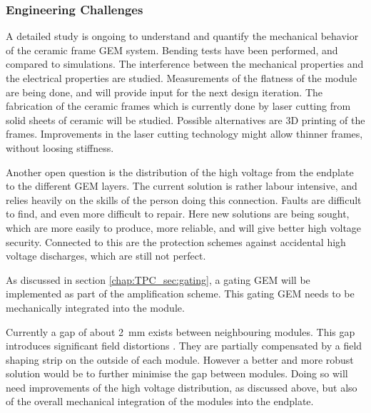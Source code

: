 \subsubsection{Engineering Challenges}
A detailed study is ongoing to understand and quantify the mechanical behavior of the ceramic frame GEM system. Bending tests have been performed, and compared to simulations. The interference between the mechanical properties and the electrical properties are studied. Measurements of the flatness of the module are being done, and will provide input for the next design iteration.
The fabrication of the ceramic frames which is currently done by laser cutting from solid sheets of ceramic will be studied. Possible alternatives are 3D printing of the frames. Improvements in the laser cutting technology might allow thinner frames, without loosing stiffness.

Another open question is the distribution of the high voltage from the endplate to the different GEM layers. The current solution is rather labour intensive, and relies heavily on the skills of the person doing this connection. Faults are difficult to find, and even more difficult to repair. Here new solutions are being sought, which are more easily to produce, more reliable, and will give better high voltage security. Connected to this are the protection schemes against accidental high voltage discharges, which are still not perfect.

As discussed in section \ref{chap:TPC_sec:gating}, a gating GEM will be implemented as part of the amplification scheme. This gating GEM needs to be mechanically integrated into the module.

Currently a gap of about \SI{2}{\milli\meter} exists between neighbouring modules. This gap introduces significant field distortions \cite{ZenkerPhD}. They are partially compensated by a field shaping strip on the outside of each module. However a better and more robust solution would be to further minimise the gap between modules. Doing so will need improvements of the high voltage distribution, as discussed above, but also of the overall mechanical integration of the modules into the endplate.

